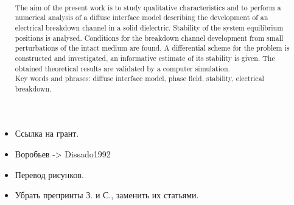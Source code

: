 \documentclass[a4paper,12pt]{article}
\title{
  \ArticleTitleEnglish
}
\author{
	\ArticleAuthorsEnglish \\[3mm]
	{\normalsize \ArticleInstitutesEnglish}
}
\date{\vspace{-0.8cm}}
\theoremstyle{plain}
\theoremstyle{remark}
\newcommand{\ArticleTitleEnglish}{
	Stability of stationary equilibrium solutions of a diffuse interface electrical breakdown model
}
\newcommand{\ArticleAuthorsEnglish}{
	A.~S.~Ponomarev\textsuperscript{1}, E.~V.~Zipunova\textsuperscript{1}, E.~B.~Savenkov\textsuperscript{1}
}
\newcommand{\ArticleInstitutesEnglish}{
	\textsuperscript{1}Keldysh Institute of Applied Mathematics, Moscow, Russia
}
\begin{document}
{\bfseries
  \begin{itemize}
  \item Ссылка на грант.
  \item Воробьев -> Dissado1992
  \item Перевод рисунков.
  \item Убрать препринты З. и С., заменить их статьями.
  \end{itemize}
}



\maketitle

\renewcommand{\abstractname}{}
\renewcommand{\absnamepos}{empty}

\begin{abstract}
  
  
  
  The aim of the present work is to study qualitative characteristics
  and to perform a numerical analysis of a diffuse interface model
  describing the development of an electrical breakdown channel in a
  solid dielectric. Stability of the system equilibrium positions is
  analysed. Conditions for the breakdown channel development from
  small perturbations of the intact medium are found. A differential
  scheme for the problem is constructed and investigated, an
  informative estimate of its stability is given. The obtained
  theoretical results are validated by a computer simulation. \\[3mm]
%
  Key words and phrases: diffuse interface model, phase field,
  stability, electrical breakdown.
\end{abstract}














\printbibliography
\end{document}
